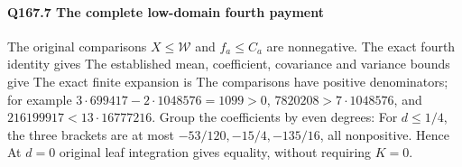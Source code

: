 \paragraph{Q167.7 The complete low-domain fourth payment}\label{part:Q167.7}
The original comparisons $X\le\allowbreak \mathcal W$ and $f_a\le\allowbreak  C_a$ are
nonnegative. The exact fourth identity gives
The established mean, coefficient, covariance and variance bounds give
The exact finite expansion is
The comparisons have positive denominators; for example
$3\cdot699417-2\cdot1048576=\allowbreak 1099>\allowbreak 0$,
$7820208>\allowbreak 7\cdot1048576$, and $216199917<\allowbreak 13\cdot16777216$.
Group the coefficients by even degrees:
For $d\le\allowbreak 1/4$, the three brackets are at most
$-53/120,\allowbreak -15/4,\allowbreak -135/16$, all nonpositive. Hence
At $d=\allowbreak 0$ original leaf integration gives equality, without requiring $K=\allowbreak 0$.

